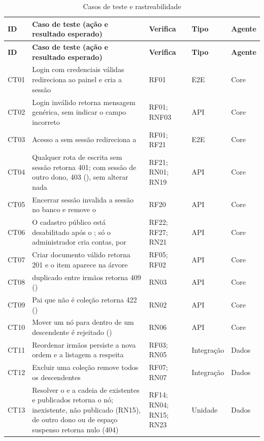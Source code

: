 \begin{longtable}{@{}L{1.1cm}L{7.0cm}L{2.2cm}L{1.6cm}L{1.6cm}@{}}
\caption{Casos de teste e rastreabilidade}\label{tab:casos-teste}\\
\toprule
\textbf{ID} & \textbf{Caso de teste (ação e resultado esperado)} & \textbf{Verifica} & \textbf{Tipo} & \textbf{Agente}\\
\midrule
\endfirsthead
\toprule
\textbf{ID} & \textbf{Caso de teste (ação e resultado esperado)} & \textbf{Verifica} & \textbf{Tipo} & \textbf{Agente}\\
\midrule
\endhead
\bottomrule
\endfoot
CT01 & Login com credenciais válidas redireciona ao painel e cria a sessão & RF01 & E2E & Core\\[2pt]
CT02 & Login inválido retorna mensagem genérica, sem indicar o campo incorreto & RF01; RNF03 & API & Core\\[2pt]
CT03 & Acesso a  sem sessão redireciona a  & RF01; RF21 & E2E & Core\\[2pt]
CT04 & Qualquer rota de escrita sem sessão retorna 401; com sessão de outro dono, 403 (), sem alterar nada & RF21; RN01; RN19 & API & Core\\[2pt]
CT05 & Encerrar sessão invalida a sessão no banco e remove o  & RF20 & API & Core\\[2pt]
CT06 & O cadastro público está desabilitado após o ; só o administrador cria contas, por  & RF22; RF27; RN21 & API & Core\\[2pt]
CT07 & Criar documento válido retorna 201 e o item aparece na árvore & RF05; RF02 & API & Core\\[2pt]
CT08 &  duplicado entre irmãos retorna 409 () & RN03 & API & Core\\[2pt]
CT09 & Pai que não é coleção retorna 422 () & RN02 & API & Core\\[2pt]
CT10 & Mover um nó para dentro de um descendente é rejeitado () & RN06 & API & Core\\[2pt]
CT11 & Reordenar irmãos persiste a nova ordem e a listagem a respeita & RF03; RN05 & Integração & Dados\\[2pt]
CT12 & Excluir uma coleção remove todos os descendentes & RF07; RN07 & Integração & Dados\\[2pt]
CT13 & Resolver o  e a cadeia de  existentes e publicados retorna o nó; inexistente, não publicado (RN15), de outro dono ou de espaço suspenso retorna nulo (404) & RF14; RN04; RN15; RN23 & Unidade & Dados\\[2pt]

\end{longtable}
